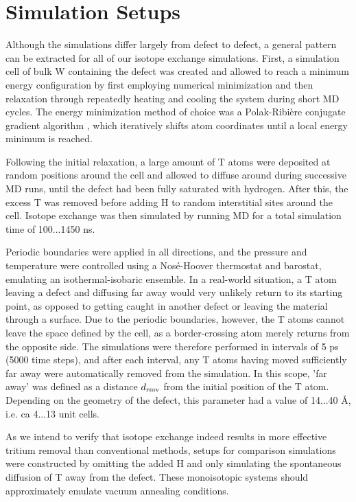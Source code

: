 \section{Simulation Setups}
Although the simulations differ largely from defect to defect, a general pattern can be extracted for all of our isotope exchange simulations. 
First, a simulation cell of bulk W containing the defect was created and allowed to reach a minimum energy configuration by first employing numerical minimization and then relaxation through repeatedly heating and cooling the system during short MD cycles. 
The energy minimization method of choice was a Polak-Ribi\`{e}re conjugate gradient algorithm \cite{polak1969note}, which iteratively shifts atom coordinates until a local energy minimum is reached. 

Following the initial relaxation, a large amount of T atoms were deposited at random positions around the cell and allowed to diffuse around during successive MD runs, until the defect had been fully saturated with hydrogen.
After this, the excess T was removed before adding H to random interstitial sites around the cell. 
Isotope exchange was then simulated by running MD for a total simulation time of 100...1450 ns. 

Periodic boundaries were applied in all directions, and the pressure and temperature were controlled using a Nos\'{e}-Hoover thermostat and barostat, emulating an isothermal-isobaric ensemble. 
In a real-world situation, a T atom leaving a defect and diffusing far away would very unlikely return to its starting point, as opposed to getting caught in another defect or leaving the material through a surface. 
Due to the periodic boundaries, however, the T atoms cannot leave the space defined by the cell, as a border-crossing atom merely returns from the opposite side. 
The simulations were therefore performed in intervals of 5 ps (5000 time steps), and after each interval, any T atoms having moved sufficiently far away were automatically removed from the simulation. 
In this scope, 'far away' was defined as a distance $d_{\rm{rmv}} $ from the initial position of the T atom. 
Depending on the geometry of the defect, this parameter had a value of 14...40 \AA, i.e. ca 4...13 unit cells.

As we intend to verify that isotope exchange indeed results in more effective tritium removal than conventional methods, setups for comparison simulations were constructed by omitting the added H and only simulating the spontaneous diffusion of T away from the defect. 
These monoisotopic systems should approximately emulate vacuum annealing conditions.  


